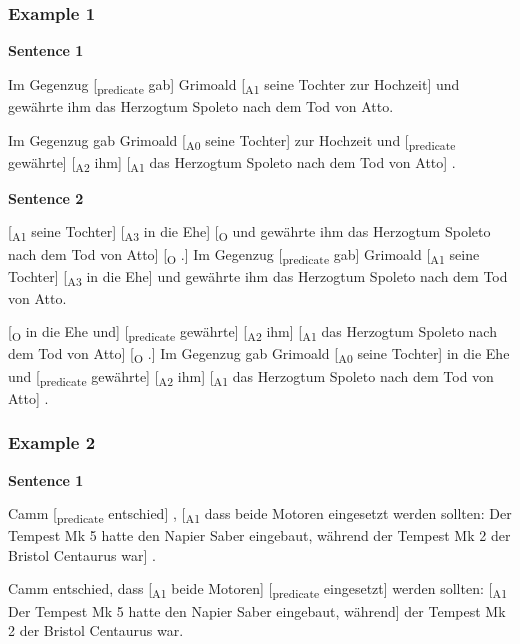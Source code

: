 \begin{landscape}

\subsubsection{Example 1}

\textbf{Sentence 1}

Im Gegenzug [\textsubscript{predicate} gab] Grimoald [\textsubscript{A1} seine Tochter zur
Hochzeit] und gewährte ihm das Herzogtum Spoleto nach dem Tod von Atto.

Im Gegenzug gab Grimoald [\textsubscript{A0} seine Tochter] zur Hochzeit und
[\textsubscript{predicate} gewährte] [\textsubscript{A2} ihm] [\textsubscript{A1} das Herzogtum
Spoleto nach dem Tod von Atto] .

\textbf{Sentence 2}

[\textsubscript{A1} seine Tochter] [\textsubscript{A3} in die Ehe] [\textsubscript{O} und
gewährte ihm das Herzogtum Spoleto nach dem Tod von Atto] [\textsubscript{O} .]  Im Gegenzug
[\textsubscript{predicate} gab] Grimoald [\textsubscript{A1} seine Tochter] [\textsubscript{A3}
in die Ehe] und gewährte ihm das Herzogtum Spoleto nach dem Tod von Atto.

[\textsubscript{O} in die Ehe und] [\textsubscript{predicate} gewährte] [\textsubscript{A2}
ihm] [\textsubscript{A1} das Herzogtum Spoleto nach dem Tod von Atto] [\textsubscript{O} .]  Im
Gegenzug gab Grimoald [\textsubscript{A0} seine Tochter] in die Ehe und [\textsubscript{predicate}
gewährte] [\textsubscript{A2} ihm] [\textsubscript{A1} das Herzogtum Spoleto nach dem Tod
von Atto] .



\subsubsection{Example 2}

\textbf{Sentence 1}

Camm [\textsubscript{predicate} entschied] , [\textsubscript{A1} dass beide Motoren eingesetzt
werden sollten: Der Tempest Mk 5 hatte den Napier Saber eingebaut, während der Tempest Mk 2
der Bristol Centaurus war] .

Camm entschied, dass [\textsubscript{A1} beide Motoren] [\textsubscript{predicate} eingesetzt]
werden sollten: [\textsubscript{A1} Der Tempest Mk 5 hatte den Napier Saber eingebaut, während]
der Tempest Mk 2 der Bristol Centaurus war.


\end{landscape}
